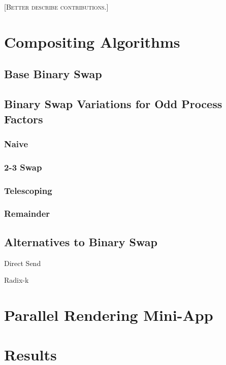 \documentclass{vgtc}                          %
\newcommand{\fix}[1]{{\color{red}\textsc{[#1]}}}
\begin{document}
\fix{Better describe contributions.}

\section{Compositing Algorithms}

\subsection{Base Binary Swap}
\label{sec:BinarySwap}

\subsection{Binary Swap Variations for Odd Process Factors}
\label{sec:BinarySwapVariations}

\subsubsection{Naive}

\subsubsection{2-3 Swap}

\subsubsection{Telescoping}

\subsubsection{Remainder}

\subsection{Alternatives to Binary Swap}
\label{sec:BinarySwapAlternatives}

Direct Send

Radix-k

\section{Parallel Rendering Mini-App}

\section{Results}
\label{sec:Results}
\end{document}
